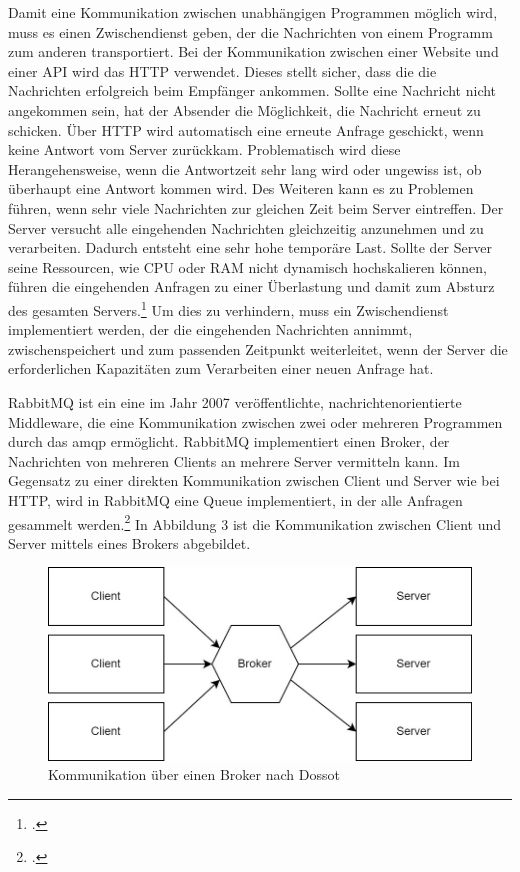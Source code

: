 Damit eine Kommunikation zwischen unabhängigen Programmen möglich wird, muss es einen Zwischendienst geben, der die Nachrichten von einem Programm zum anderen transportiert. Bei der Kommunikation zwischen einer Website und einer API wird das HTTP verwendet. Dieses stellt sicher, dass die die Nachrichten erfolgreich beim Empfänger ankommen. Sollte eine Nachricht nicht angekommen sein, hat der Absender die Möglichkeit, die Nachricht erneut zu schicken. Über HTTP wird automatisch eine erneute Anfrage geschickt, wenn keine Antwort vom Server zurückkam. Problematisch wird diese Herangehensweise, wenn die Antwortzeit sehr lang wird oder ungewiss ist, ob überhaupt eine Antwort kommen wird. Des Weiteren kann es zu Problemen führen, wenn sehr viele Nachrichten zur gleichen Zeit beim Server eintreffen. Der Server versucht alle eingehenden Nachrichten gleichzeitig anzunehmen und zu verarbeiten. Dadurch entsteht eine sehr hohe temporäre Last. Sollte der Server seine Ressourcen, wie CPU oder RAM nicht dynamisch hochskalieren können, führen die eingehenden Anfragen zu einer Überlastung und damit zum Absturz des gesamten Servers.\footcite{hoque2015botnet} Um dies zu verhindern, muss ein Zwischendienst implementiert werden, der die eingehenden Nachrichten annimmt, zwischenspeichert und zum passenden Zeitpunkt weiterleitet, wenn der Server die erforderlichen Kapazitäten zum Verarbeiten einer neuen Anfrage hat.

RabbitMQ ist ein eine im Jahr 2007 veröffentlichte, nachrichtenorientierte Middleware, die eine Kommunikation zwischen zwei oder mehreren Programmen durch das \ac{amqp} ermöglicht. RabbitMQ implementiert einen Broker, der Nachrichten von mehreren Clients an mehrere Server vermitteln kann. Im Gegensatz zu einer direkten Kommunikation zwischen Client und Server wie bei HTTP, wird in RabbitMQ eine Queue implementiert, in der alle Anfragen gesammelt werden.\footcite{JohanssonLovisa2020REBD} In Abbildung 3 ist die Kommunikation zwischen Client und Server mittels eines Brokers abgebildet.
 
\begin{figure}[H]
  \centering
    \includegraphics[width = 12cm]{bilder/Rabbit2}
    \caption{Kommunikation über einen Broker nach Dossot}
\end{figure}

